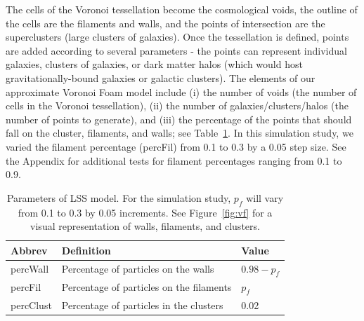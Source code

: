 \documentclass[12pt]{article}
\newcommand{\figref}[1]{Figure~\ref{#1}}
\begin{document}
The cells of the Voronoi tessellation become the cosmological voids, the outline of the cells are the filaments and walls, and the points of intersection are the superclusters (large clusters of galaxies).  Once the tessellation is defined, points are added according to several parameters - the points can represent individual galaxies, clusters of galaxies, or dark matter halos (which would host gravitationally-bound galaxies or galactic clusters).
The elements of our approximate Voronoi Foam model include (i) the number of voids (the number of cells in the Voronoi tessellation), (ii) the number of galaxies/clusters/halos (the number of points to generate), and (iii) the percentage of the points that should fall on the cluster, filaments, and walls; see Table~\ref{table:voronoisettings}. In this simulation study, we varied the filament percentage (percFil) from 0.1 to 0.3 by a 0.05 step size. See the Appendix for additional tests for filament percentages ranging from 0.1 to 0.9.

\begin{table}[htp!]
\begin{center}
\begin{tabular}{ l|l|l }
Abbrev & Definition & Value \\
\hline
percWall & Percentage of particles on the walls & $0.98 - p_{f}$ \\
percFil & Percentage of particles on the filaments & $p_{f}$ \\
percClust & Percentage of particles in the clusters & 0.02 \\
\end{tabular}
\end{center}
\caption{Parameters of LSS model. For the simulation study, $p_{f}$ will vary from 0.1 to 0.3 by 0.05 increments. See \figref{fig:vf} for a visual representation of walls, filaments, and clusters.}
\label{table:voronoisettings}
\end{table}
\end{document}
